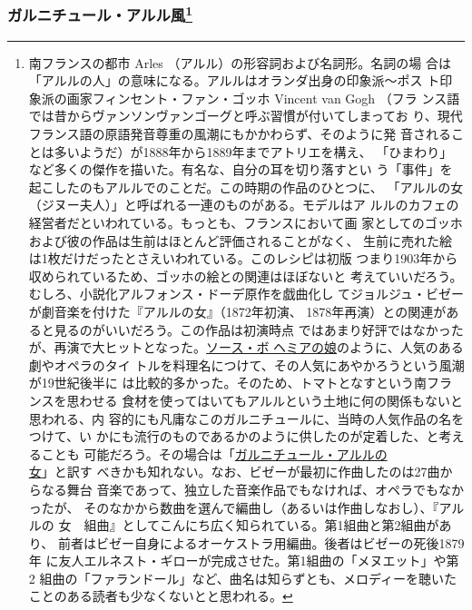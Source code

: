 \begin{recette}
{\subsubsection[ガルニチュール・アルル風]{\texorpdfstring{ガルニチュール・アルル風\footnote{南フランスの都市
  Arles （アルル）の形容詞および名詞形。名詞の場
  合は「アルルの人」の意味になる。アルルはオランダ出身の印象派〜ポス
  ト印象派の画家フィンセント・ファン・ゴッホ Vincent van Gogh （フラ
  ンス語では昔からヴァンソンヴァンゴーグと呼ぶ習慣が付いてしまってお
  り、現代フランス語の原語発音尊重の風潮にもかかわらず、そのように発
  音されることは多いようだ）が1888年から1889年までアトリエを構え、
  「ひまわり」など多くの傑作を描いた。有名な、自分の耳を切り落すとい
  う「事件」を起こしたのもアルルでのことだ。この時期の作品のひとつに、
  「アルルの女（ジヌー夫人）」と呼ばれる一連のものがある。モデルはア
  ルルのカフェの経営者だといわれている。もっとも、フランスにおいて画
  家としてのゴッホおよび彼の作品は生前はほとんど評価されることがなく、
  生前に売れた絵は1枚だけだったとさえいわれている。このレシピは初版
  つまり1903年から収められているため、ゴッホの絵との関連はほぼないと
  考えていいだろう。むしろ、小説化アルフォンス・ドーデ原作を戯曲化し
  てジョルジュ・ビゼーが劇音楽を付けた『アルルの女』（1872年初演、
  1878年再演）との関連があると見るのがいいだろう。この作品は初演時点
  ではあまり好評ではなかったが、再演で大ヒットとなった。\protect\hyperlink{sauce-bohemienne}{ソース・ボ
  ヘミアの娘}のように、人気のある劇やオペラのタイ
  トルを料理名につけて、その人気にあやかろうという風潮が19世紀後半に
  は比較的多かった。そのため、トマトとなすという南フランスを思わせる
  食材を使ってはいてもアルルという土地に何の関係もないと思われる、内
  容的にも凡庸なこのガルニチュールに、当時の人気作品の名をつけて、い
  かにも流行のものであるかのように供したのが定着した、と考えることも
  可能だろう。その場合は「\ul{ガルニチュール・アルルの\\女}」と訳す
  べきかも知れない。なお、ビゼーが最初に作曲したのは27曲からなる舞台
  音楽であって、独立した音楽作品でもなければ、オペラでもなかったが、
  そのなかから数曲を選んで編曲し（あるいは作曲しなおし）、『アルルの
  女　組曲』としてこんにち広く知られている。第1組曲と第2組曲があり、
  前者はビゼー自身によるオーケストラ用編曲。後者はビゼーの死後1879年
  に友人エルネスト・ギローが完成させた。第1組曲の「メヌエット」や第2
  組曲の「ファランドール」など、曲名は知らずとも、メロディーを聴いた
  ことのある読者も少なくないとと思われる。}}{ガルニチュール・アルル風}}\label{garniture-arlesienne}}



\end{recette}
